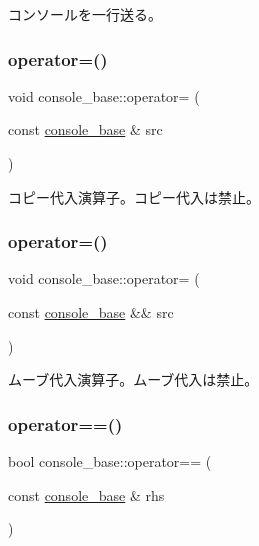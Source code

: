 コンソールを一行送る。 \hypertarget{classconsole__base_aca6f22d7287a8c9f0463b6b9d2a746a4}{}\label{classconsole__base_aca6f22d7287a8c9f0463b6b9d2a746a4} 
\subsubsection{\texorpdfstring{operator=()}{operator=()}\hspace{0.1cm}{\footnotesize\ttfamily [1/2]}}
{\footnotesize\ttfamily void console\+\_\+base\+::operator= (\begin{DoxyParamCaption}\item[{const \hyperlink{classconsole__base}{console\+\_\+base} \&}]{src }\end{DoxyParamCaption})\hspace{0.3cm}{\ttfamily [delete]}}

コピー代入演算子。コピー代入は禁止。 \hypertarget{classconsole__base_ae641c39b964cabdde834f67cd77b556a}{}\label{classconsole__base_ae641c39b964cabdde834f67cd77b556a} 
\subsubsection{\texorpdfstring{operator=()}{operator=()}\hspace{0.1cm}{\footnotesize\ttfamily [2/2]}}
{\footnotesize\ttfamily void console\+\_\+base\+::operator= (\begin{DoxyParamCaption}\item[{const \hyperlink{classconsole__base}{console\+\_\+base} \&\&}]{src }\end{DoxyParamCaption})\hspace{0.3cm}{\ttfamily [delete]}}

ムーブ代入演算子。ムーブ代入は禁止。 \hypertarget{classconsole__base_a28633feb8f1724680c255166ee9b2e1a}{}\label{classconsole__base_a28633feb8f1724680c255166ee9b2e1a} 
\subsubsection{\texorpdfstring{operator==()}{operator==()}}
{\footnotesize\ttfamily bool console\+\_\+base\+::operator== (\begin{DoxyParamCaption}\item[{const \hyperlink{classconsole__base}{console\+\_\+base} \&}]{rhs }\end{DoxyParamCaption})}

